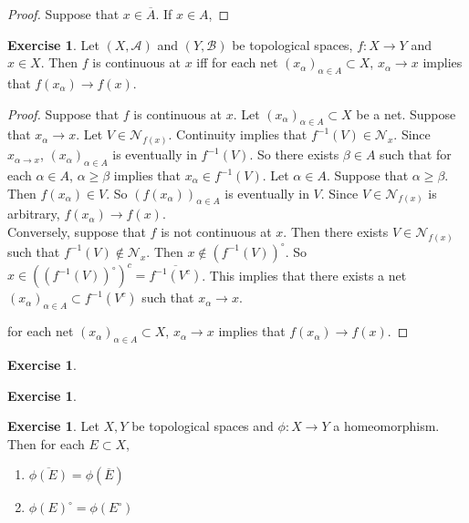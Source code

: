\documentclass[12pt]{amsart}
\theoremstyle{definition}
\newtheorem{ex}[definition]{Exercise}
\newcommand{\al}{\alpha}
\newcommand{\be}{\beta}
\newcommand{\MA}{\mathcal{A}}
\newcommand{\MB}{\mathcal{B}}
\newcommand{\MN}{\mathcal{N}}
\newcommand{\lex}[1]{\label{ex:#1}}
\begin{document}
	\begin{proof}
	Suppose that $x \in \overline{A}$. If $x \in A$, 
	\end{proof}
	
	\begin{ex} \lex{}
	Let $(X,\MA)$ and $(Y,\MB)$ be topological spaces, $f:X \rightarrow Y$ and $x \in X$. Then $f$ is continuous at $x$ iff for each net $(x_{\al})_{\al \in A} \subset X$, $x_{\al} \rightarrow x$ implies that $f(x_{\al}) \rightarrow f(x)$. 
	\end{ex}
	
	\begin{proof}
	Suppose that $f$ is continuous at $x$. Let $(x_{\al})_{\al \in A} \subset X$ be a net. Suppose that $x_{\al} \rightarrow x$. Let $V \in \MN_{f(x)}$. Continuity implies that $f^{-1}(V) \in \MN_{x}$. Since  $x_{\al \rightarrow x}$, $(x_{\al})_{\al \in A}$ is eventually in $f^{-1}(V)$. So there exists $\be \in A$ such that for each $\al \in A$, $\al \geq \be$ implies that $x_{\al} \in f^{-1}(V)$. Let $\al \in A$. Suppose that $\al \geq \be$. Then $f(x_{\al}) \in V$. So $(f(x_{\al}))_{\al \in A}$ is eventually in $V$. Since $V \in \MN_{f(x)}$ is arbitrary, $f(x_{\al}) \rightarrow f(x)$.\\
	Conversely, suppose that $f$ is not continuous at $x$. Then there exists $V \in \MN_{f(x)}$ such that $f^{-1}(V) \not \in \MN_x$. Then $x \not \in (f^{-1}(V))^{\circ}$. So $x \in ((f^{-1}(V))^{\circ})^c = \overline{f^{-1}(V^c)}$. This implies that there exists a net $(x_{\al})_{\al \in A} \subset f^{-1}(V^c)$ such that $x_{\al} \rightarrow x$.
	
	for each net $(x_{\al})_{\al \in A} \subset X$, $x_{\al} \rightarrow x$ implies that $f(x_{\al}) \rightarrow f(x)$. 
\end{proof}		
	
	\begin{ex} \lex{}
	
	\end{ex}
	
	
	\begin{ex} \lex{}
	
	\end{ex}
	
	\begin{ex} \lex{}
		Let $X, Y$ be topological spaces and $\phi: X \rightarrow Y$ a homeomorphism. Then for each $E \subset X$, 
		\begin{enumerate}
			\item $\overline{\phi(E)} = \phi(\overline{E})$  \item $\phi(E)^{\circ} = \phi(E^{\circ})$  
		\end{enumerate} 
	\end{ex}
	
\end{document}
